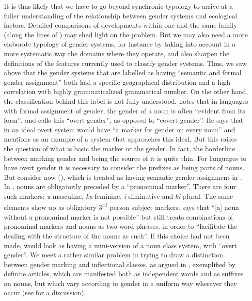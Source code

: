 \documentclass[output=collectionpaper]{langsci/langscibook}
\begin{document}
It is thus likely that we have to go beyond synchronic typology to arrive at a fuller understanding of the relationship between gender systems and ecological factors. Detailed comparisons of developments within one and the same family (along the lines of ) may shed light on the problem. But we may also need a more elaborate typology of gender systems, for instance by taking into account in a more systematic way the domains where they operate, and also sharpen the definitions of the features currently used to classify gender systems. Thus, we saw above that the gender systems that are labelled as having ``semantic and formal gender assignment'' both had a specific geographical distribution and a high correlation with highly grammaticalized grammatical number. On the other hand, the classification behind this label is not fully understood. \citet[62]{Corbett1991} notes that in languages with formal assignment of gender, the gender of a noun is often ``evident from its form'', and calls this ``overt gender'', as opposed to ``covert gender''. He says that in an ideal overt system would have ``a marker for gender on every noun'' and mentions  as an example of a system that approaches this ideal. But this raises the question of what is basic \textendash{} the marker or the gender. In fact, the borderline between marking gender and being the source of it is quite thin. For  languages to have overt gender it is necessary to consider the prefixes as being parts of nouns. But consider now  (), which is treated as having semantic gender assignment in \citet{Corbett2013b}.  In , nouns are obligatorily preceded by a ``pronominal marker''. There are four such markers: \textit{u} masculine, \textit{ka} feminine, \textit{i} diminutive and \textit{ki} plural. The same elements show up as obligatory 3\textsuperscript{rd} person subject markers. \citet[7]{Nagaraj1985} says that ``[a] noun without a pronominal marker is not possible'' but still treats combinations of pronominal markers and nouns as two-word phrases, in order to ``facilitate the dealing with the structure of the nouns as such''. If this choice had not been made,  would look as having a mini-version of a  noun class system, with ``overt gender''. We meet a rather similar problem in trying to draw a distinction between gender marking and inflectional classes, as argued in \citet{Dahl2000}, exemplified by  definite articles, which are manifested both as independent words and as suffixes on nouns, but which vary according to gender in a uniform way wherever they occur (see \citealt{Dahl2000} for a discussion).
\end{document}
